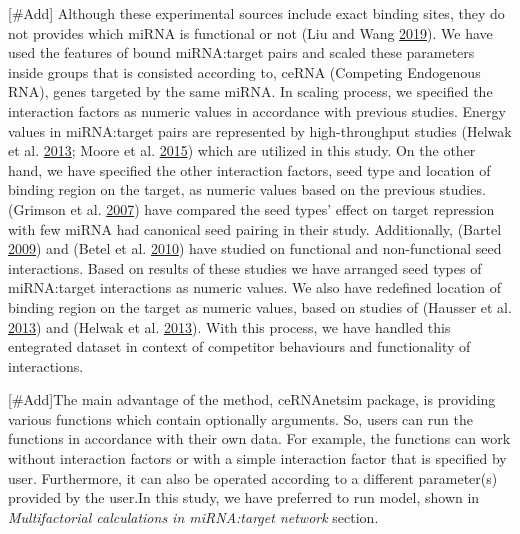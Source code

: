 \documentclass[]{article}
\begin{document}
{[}\#Add{]} Although these experimental sources include exact binding
sites, they do not provides which miRNA is functional or not (Liu and
Wang \protect\hyperlink{ref-liu2019prediction}{2019}). We have used the
features of bound miRNA:target pairs and scaled these parameters inside
groups that is consisted according to, ceRNA (Competing Endogenous RNA),
genes targeted by the same miRNA. In scaling process, we specified the
interaction factors as numeric values in accordance with previous
studies. Energy values in miRNA:target pairs are represented by
high-throughput studies (Helwak et al.
\protect\hyperlink{ref-helwak_mapping_2013}{2013}; Moore et al.
\protect\hyperlink{ref-moore_mirnatarget_2015}{2015}) which are utilized
in this study. On the other hand, we have specified the other
interaction factors, seed type and location of binding region on the
target, as numeric values based on the previous studies.(Grimson et al.
\protect\hyperlink{ref-grimson_microrna_2007}{2007}) have compared the
seed types' effect on target repression with few miRNA had canonical
seed pairing in their study. Additionally, (Bartel
\protect\hyperlink{ref-bartel_micrornas:_2009}{2009}) and (Betel et al.
\protect\hyperlink{ref-betel2010comprehensive}{2010}) have studied on
functional and non-functional seed interactions. Based on results of
these studies we have arranged seed types of miRNA:target interactions
as numeric values. We also have redefined location of binding region on
the target as numeric values, based on studies of (Hausser et al.
\protect\hyperlink{ref-hausser_analysis_2013}{2013}) and (Helwak et al.
\protect\hyperlink{ref-helwak_mapping_2013}{2013}). With this process,
we have handled this entegrated dataset in context of competitor
behaviours and functionality of interactions.

{[}\#Add{]}The main advantage of the method, ceRNAnetsim package, is
providing various functions which contain optionally arguments. So,
users can run the functions in accordance with their own data. For
example, the functions can work without interaction factors or with a
simple interaction factor that is specified by user. Furthermore, it can
also be operated according to a different parameter(s) provided by the
user.In this study, we have preferred to run model, shown in
\emph{Multifactorial calculations in miRNA:target network} section.
\end{document}
